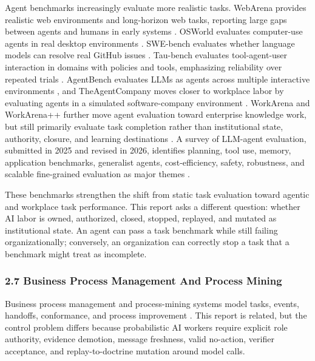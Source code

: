 \documentclass[
]{article}
\begin{document}
Agent benchmarks increasingly evaluate more realistic tasks. WebArena provides realistic web environments and long-horizon web tasks, reporting large gaps between agents and humans in early systems \citep{zhou2023webarena}. OSWorld evaluates computer-use agents in real desktop environments \citep{xie2024osworld}. SWE-bench evaluates whether language models can resolve real GitHub issues \citep{jimenez2023swebench}. Tau-bench evaluates tool-agent-user interaction in domains with policies and tools, emphasizing reliability over repeated trials \citep{yao2024taubench}. AgentBench evaluates LLMs as agents across multiple interactive environments \citep{liu2023agentbench}, and TheAgentCompany moves closer to workplace labor by evaluating agents in a simulated software-company environment \citep{xu2024theagentcompany}. WorkArena and WorkArena++ further move agent evaluation toward enterprise knowledge work, but still primarily evaluate task completion rather than institutional state, authority, closure, and learning destinations \citep{drouin2024workarena, boisvert2024workarenaPlus}. A survey of LLM-agent evaluation, submitted in 2025 and revised in 2026, identifies planning, tool use, memory, application benchmarks, generalist agents, cost-efficiency, safety, robustness, and scalable fine-grained evaluation as major themes \citep{yehudai2025surveyAgents}.

These benchmarks strengthen the shift from static task evaluation toward agentic and workplace task performance. This report asks a different question: whether AI labor is owned, authorized, closed, stopped, replayed, and mutated as institutional state. An agent can pass a task benchmark while still failing organizationally; conversely, an organization can correctly stop a task that a benchmark might treat as incomplete.

\subsubsection{2.7 Business Process Management And Process Mining}\label{business-process-management-and-process-mining}

Business process management and process-mining systems model tasks, events, handoffs, conformance, and process improvement \citep{dumas2018fundamentalsBpm, vanDerAalst2016processMining}. This report is related, but the control problem differs because probabilistic AI workers require explicit role authority, evidence demotion, message freshness, valid no-action, verifier acceptance, and replay-to-doctrine mutation around model calls.
\end{document}
